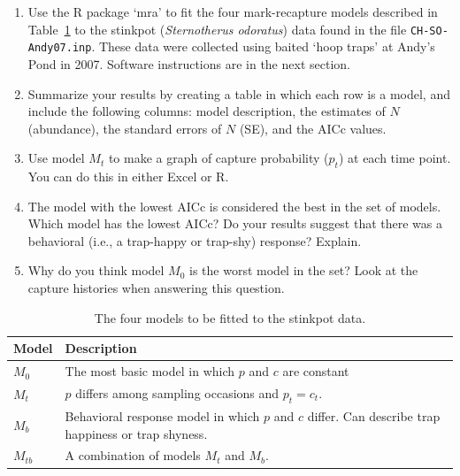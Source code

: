 \documentclass[12pt]{article}\usepackage[]{graphicx}\usepackage[]{xcolor}
\begin{document}
\begin{enumerate}
  \item Use the R package `mra' to fit the four
    mark-recapture models described in Table~\ref{tab:Otis} to the
    stinkpot ({\it Sternotherus odoratus}) data found in the file
    \texttt{CH-SO-Andy07.inp}. These data were collected using baited
    `hoop traps' at Andy's Pond in 2007. Software instructions are in
    the next section. 
  \item Summarize your results by creating a table in which each row
    is a model, and include the following columns: model description,
    the estimates of $N$ (abundance), the standard errors of $N$ (SE),
    and the AICc values.
  \item Use model $M_t$ to make a graph of capture probability ($p_t$)
    at each time point. You can do this in either Excel or R.
  \item The model with the lowest AICc is considered the best in
    the set of models. Which model has the lowest AICc? Do your
    results suggest that %
    there was a behavioral (i.e., a trap-happy or
    trap-shy) response? Explain.
  \item Why do you think model $M_0$ is the worst model
    in the set? Look at the capture histories when answering this
    question. 
\end{enumerate}

\clearpage

\begin{table}[h!]
  \centering
  \caption{The four models to be fitted to the stinkpot data.}
  \begin{tabular}[h!]{lp{5in}}
    \hline
    Model & Description \\
    \hline
    $M_0$ & The most basic model in which $p$ and $c$ are constant \\
    $M_t$ & $p$ differs among sampling occasions and $p_t=c_t$. \\
    $M_b$ & Behavioral response model in which $p$ and $c$
            differ. Can describe trap happiness or trap shyness. \\
    $M_{tb}$ & A combination of models $M_t$ and $M_b$. \\
    \hline
  \end{tabular}
  \label{tab:Otis}
\end{table}
\end{document}

